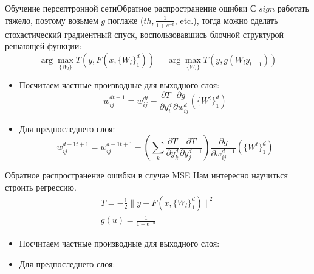 \documentclass[14pt, fleqn, xcolor={dvipsnames, table}]{beamer}
\begin{document}
\begin{frame}{Обучение персептронной сети}{Обратное распространение ошибки}
\footnotesize
С $sign$ работать тяжело, поэтому возьмем $g$ поглаже ($th, \frac{1}{1+e^{-t}}$, etc.), тогда можно сделать стохастический градиентный спуск, воспользовавшись блочной структурой решающей функции:
$$
\arg \max_{\{W_l\}} T(y, F(x, \{W_l\}_1^d)) = \arg\max_{\{W_l\}} T(y, g(W_l y_{l-1}))
$$
\begin{itemize}
  \item Посчитаем частные производные для выходного слоя:
  $$
  w_{ij}^{dt+1} = w_{ij}^{dt} - \frac{\partial T}{\partial y_i^d}\frac{\partial g}{\partial w_{ij}^d}\left(\{W^t\}_1^d\right)
  $$
  \item Для предпоследнего слоя:
  $$
  w_{ij}^{d-1t+1}  = w_{ij}^{d-1t+1} - \left(\sum_k \frac{\partial T}{\partial y_k^d}\frac{\partial T}{\partial y_j^{d-1}}\right)\frac{\partial g}{\partial w_{ij}^{d - 1}}\left(\{W^t\}_1^d\right)
  $$
  \end{itemize}
\end{frame}

\begin{frame}{Обратное распространение ошибки в случае MSE}
\footnotesize
Нам интересно научиться строить регрессию.
$$\begin{array}{c}
T = -\frac{1}{2}\|y - F(x, \{W_l\}_1^d)\|^2 \\
g(u) = \frac{1}{1 + e^{-u}}
\end{array}$$


\begin{itemize}
  \item Посчитаем частные производные для выходного слоя:
  \item Для предпоследнего слоя:
\end{itemize}
\end{frame}

\end{document}
